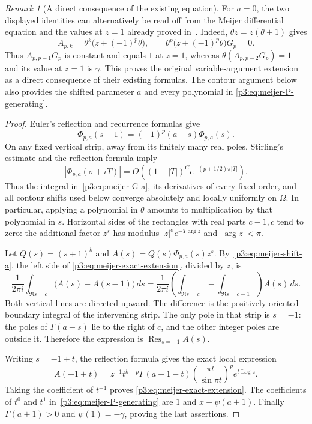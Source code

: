 \documentclass[11pt,a4paper]{article}
\theoremstyle{definition}
\theoremstyle{remark}
\newtheorem{remark}[theorem]{Remark}
\DeclareMathOperator{\Log}{Log}
\numberwithin{equation}{section}
\begin{document}
\begin{remark}[A direct consequence of the existing equation]
For $a=0$, the two displayed identities can alternatively be read off
from the Meijer differential equation and the values at $z=1$ already
proved in~\cite{p3:KMLWSK26}. Indeed, $\theta z=z(\theta+1)$ gives
\[
 A_{p,k}=\theta^k\bigl(z+(-1)^p\theta\bigr),\qquad
 \theta^p\bigl(z+(-1)^p\theta\bigr)G_p=0.
\]
Thus $A_{p,p-1}G_p$ is constant and equals $1$ at $z=1$, whereas
$\theta(A_{p,p-2}G_p)=1$ and its value at $z=1$ is $\gamma$.
This proves the original variable-argument extension as a direct
consequence of their existing formulas. The contour argument below
also provides the shifted parameter $a$ and every polynomial in
\eqref{p3:eq:meijer-P-generating}.
\end{remark}

\begin{proof}
Euler's reflection and recurrence formulas give
\begin{equation}\label{p3:eq:meijer-shift-a}
 \Phi_{p,a}(s-1)=(-1)^p(a-s)\Phi_{p,a}(s).
\end{equation}
On any fixed vertical strip, away from its finitely many real poles,
Stirling's estimate and the reflection formula imply
\[
 |\Phi_{p,a}(\sigma+iT)|
 =O\left((1+|T|)^C
        e^{-(p+1/2)\pi|T|}\right).
\]
Thus the integral in~\eqref{p3:eq:meijer-G-a}, its derivatives of every fixed
order, and all contour shifts used below converge absolutely and locally
uniformly on $\Omega$. In particular, applying a polynomial in $\theta$
amounts to multiplication by that polynomial in $s$. Horizontal sides of
the rectangles with real parts $c-1,c$ tend to zero: the additional factor
$z^s$ has modulus $|z|^\sigma e^{-T\arg z}$ and $|\arg z|<\pi$.

Let $Q(s)=(s+1)^k$ and $A(s)=Q(s)\Phi_{p,a}(s)z^s$.
By~\eqref{p3:eq:meijer-shift-a}, the left side of
\eqref{p3:eq:meijer-exact-extension}, divided by $z$, is
\[
 \frac1{2\pi i}\int_{\Re s=c}
      \bigl(A(s)-A(s-1)\bigr)\,ds
 =\frac1{2\pi i}
      \left(\int_{\Re s=c}-\int_{\Re s=c-1}\right)A(s)\,ds.
\]
Both vertical lines are directed upward. The difference is the positively
oriented boundary integral of the intervening strip. The only pole in
that strip is $s=-1$: the poles of $\Gamma(a-s)$ lie to the right of $c$,
and the other integer poles are outside it. Therefore the expression is
$\operatorname{Res}_{s=-1}A(s)$.

Writing $s=-1+t$, the reflection formula gives the exact local expression
\[
 A(-1+t)=z^{-1}t^{k-p}\Gamma(a+1-t)
       \left(\frac{\pi t}{\sin\pi t}\right)^p e^{t\Log z}.
\]
Taking the coefficient of $t^{-1}$ proves
\eqref{p3:eq:meijer-exact-extension}. The coefficients of $t^0$ and $t^1$
in~\eqref{p3:eq:meijer-P-generating} are $1$ and $x-\psi(a+1)$.
Finally $\Gamma(a+1)>0$ and $\psi(1)=-\gamma$, proving the last assertions.
\end{proof}
\end{document}
